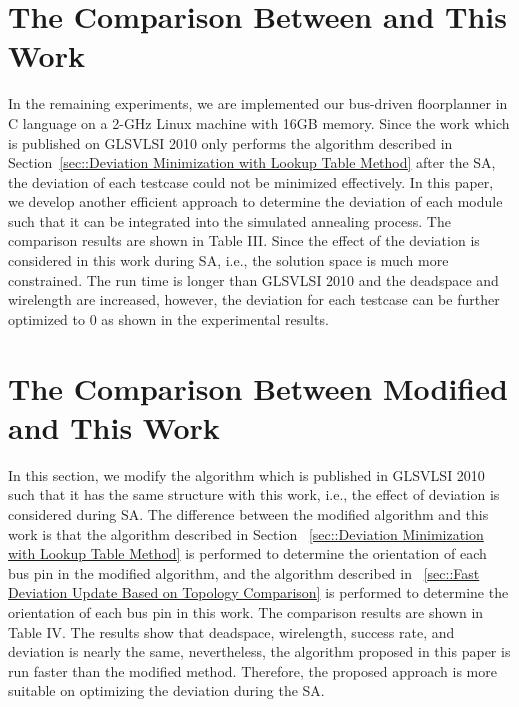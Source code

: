 \section{The Comparison Between \cite{PH10} and This Work}
\label{sec::THE COMPARISON BETWEEN GLSVLSI 2010 AND THIS WORK}
In the remaining experiments, we are implemented our bus-driven floorplanner in C
language on a 2-GHz Linux machine with 16GB memory.
Since the work which is published on GLSVLSI 2010 only performs
the algorithm described in Section~\ref{sec::Deviation Minimization with Lookup Table Method}
after the SA, the deviation of each testcase could not
be minimized effectively. In this paper, we develop another efficient
approach to determine the deviation of each module such that
it can be integrated into the simulated annealing process.
The comparison results are shown in Table III.
Since the effect of the deviation is considered in this work during SA,
i.e., the solution space is much more constrained.
The run time is longer than GLSVLSI 2010 and the deadspace and wirelength are increased, however,
the deviation for each testcase can be further optimized to 0 as shown in the experimental results.

\section{The Comparison Between Modified \cite{PH10} and This Work}
\label{sec::The Comparison Between Modified GLSVLSI 2010 and This Work}
In this section, we modify the algorithm which is published in GLSVLSI 2010
such that it has the same structure with this work, i.e., the effect of
deviation is considered during SA.
The difference between the modified algorithm and this work is that
the algorithm described in Section ~\ref{sec::Deviation Minimization with Lookup Table Method}
is performed to determine the orientation of each bus pin in the modified algorithm, and
the algorithm described in ~\ref{sec::Fast Deviation Update Based on Topology Comparison}
is performed to determine the orientation of each bus pin in this work.
The comparison results are shown in Table IV.
The results show that deadspace, wirelength, success rate, and deviation is
nearly the same, nevertheless, the algorithm proposed in this paper is
run faster than the modified method.
Therefore, the proposed approach is more suitable on optimizing the
deviation during the SA.

